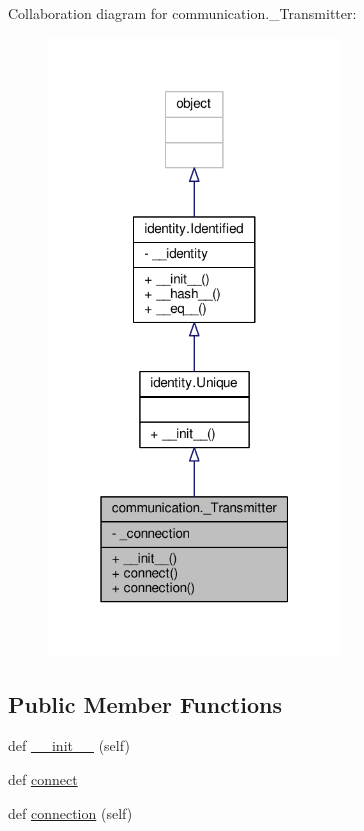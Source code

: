Collaboration diagram for communication.\+\_\+\+Transmitter\+:\nopagebreak
\begin{figure}[H]
\begin{center}
\leavevmode
\includegraphics[width=220pt]{classcommunication_1_1__Transmitter__coll__graph}
\end{center}
\end{figure}
\subsection*{Public Member Functions}
\begin{DoxyCompactItemize}
\item 
def \hyperlink{classcommunication_1_1__Transmitter_a509e3f22ffff38adfd38cfa5a3e49586}{\+\_\+\+\_\+init\+\_\+\+\_\+} (self)
\item 
def \hyperlink{classcommunication_1_1__Transmitter_a2c5f4348a13968ba815b64cae89b4cd8}{connect}
\item 
def \hyperlink{classcommunication_1_1__Transmitter_af3f5e819de9b1235db609470d6341d28}{connection} (self)
\end{DoxyCompactItemize}
